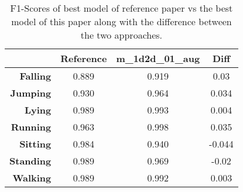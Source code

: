 \begin{table}[!htbp]
\footnotesize
\captionsetup{font=scriptsize, justification=centering}
\centering
\begin{tabular}{r|c|c|c|}
\cline{2-4}
\multicolumn{1}{c|}{} & \textbf{Reference} & \textbf{m\_1d2d\_01\_aug} & \textbf{Diff} \\ \hline
\multicolumn{1}{|r|}{\textbf{Falling}} & 0.889 & 0.919 & \cellcolor[HTML]{9AFF99}0.03 \\ \hline
\multicolumn{1}{|r|}{\textbf{Jumping}} & 0.930 & 0.964 & \cellcolor[HTML]{9AFF99}0.034 \\ \hline
\multicolumn{1}{|r|}{\textbf{Lying}} & 0.989 & 0.993 & \cellcolor[HTML]{9AFF99}0.004 \\ \hline
\multicolumn{1}{|r|}{\textbf{Running}} & 0.963 & 0.998 & \cellcolor[HTML]{9AFF99}0.035 \\ \hline
\multicolumn{1}{|r|}{\textbf{Sitting}} & 0.984 & 0.940 & \cellcolor[HTML]{FFCE93}-0.044 \\ \hline
\multicolumn{1}{|r|}{\textbf{Standing}} & 0.989 & 0.969 & \cellcolor[HTML]{FFCE93}-0.02 \\ \hline
\multicolumn{1}{|r|}{\textbf{Walking}} & 0.989 & 0.992 & \cellcolor[HTML]{9AFF99}0.003 \\ \hline
\end{tabular}
\caption{F1-Scores of best model of reference paper \cite{base-paper} vs the best model of this paper along with the difference between the two approaches.}
\label{comparison_table}
\end{table}